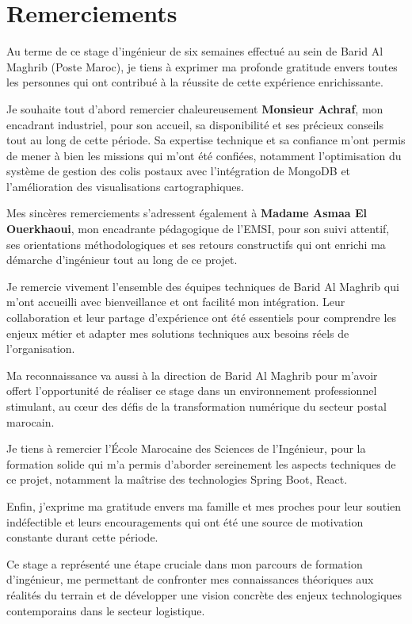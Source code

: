 \chapter*{Remerciements}

Au terme de ce stage d'ingénieur de six semaines effectué au sein de Barid Al Maghrib (Poste Maroc), je tiens à exprimer ma profonde gratitude envers toutes les personnes qui ont contribué à la réussite de cette expérience enrichissante.

Je souhaite tout d'abord remercier chaleureusement \textbf{Monsieur Achraf}, mon encadrant industriel, pour son accueil, sa disponibilité et ses précieux conseils tout au long de cette période. Sa expertise technique et sa confiance m'ont permis de mener à bien les missions qui m'ont été confiées, notamment l'optimisation du système de gestion des colis postaux avec l'intégration de MongoDB et l'amélioration des visualisations cartographiques.

Mes sincères remerciements s'adressent également à \textbf{Madame Asmaa El Ouerkhaoui}, mon encadrante pédagogique de l'EMSI, pour son suivi attentif, ses orientations méthodologiques et ses retours constructifs qui ont enrichi ma démarche d'ingénieur tout au long de ce projet.

Je remercie vivement l'ensemble des équipes techniques de Barid Al Maghrib qui m'ont accueilli avec bienveillance et ont facilité mon intégration. Leur collaboration et leur partage d'expérience ont été essentiels pour comprendre les enjeux métier et adapter mes solutions techniques aux besoins réels de l'organisation.

Ma reconnaissance va aussi à la direction de Barid Al Maghrib pour m'avoir offert l'opportunité de réaliser ce stage dans un environnement professionnel stimulant, au cœur des défis de la transformation numérique du secteur postal marocain.

Je tiens à remercier l'École Marocaine des Sciences de l'Ingénieur, pour la formation solide qui m'a permis d'aborder sereinement les aspects techniques de ce projet, notamment la maîtrise des technologies Spring Boot, React.

Enfin, j'exprime ma gratitude envers ma famille et mes proches pour leur soutien indéfectible et leurs encouragements qui ont été une source de motivation constante durant cette période.

Ce stage a représenté une étape cruciale dans mon parcours de formation d'ingénieur, me permettant de confronter mes connaissances théoriques aux réalités du terrain et de développer une vision concrète des enjeux technologiques contemporains dans le secteur logistique.